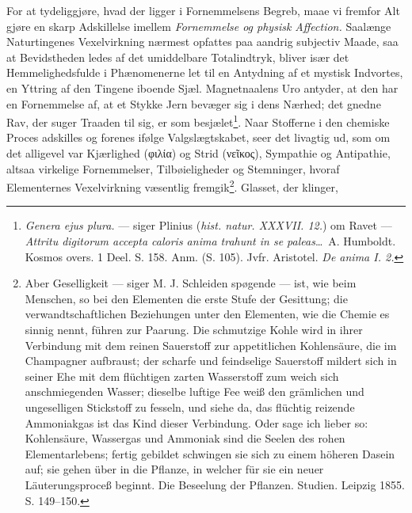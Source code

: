 \documentclass[12pt,a4paper]{book}
\begin{document}
For at tydeliggjøre, hvad der ligger i Fornemmelsens Begreb, maae vi fremfor
Alt gjøre en skarp Adskillelse imellem \emph{Fornemmelse og physisk
Affection.} Saalænge Naturtingenes Vexelvirkning nærmest opfattes paa aandrig
subjectiv Maade, saa at Bevidstheden ledes af det umiddelbare Totalindtryk,
bliver især det Hemmelighedsfulde i Phænomenerne let til en Antydning af et
mystisk Indvortes, en Yttring af den Tingene iboende Sjæl. Magnetnaalens Uro
antyder, at den har en Fornemmelse af, at et Stykke Jern bevæger sig i dens
Nærhed; det gnedne Rav, der suger Traaden til sig, er som
besjælet\footnote{\textit{Genera ejus plura.} --- siger Plinius
(\textit{hist. natur. XXXVII. 12.}) om Ravet --- \textit{Attritu digitorum
accepta caloris anima trahunt in se paleas}\ldots\ A. Humboldt. Kosmos overs.
1 Deel. S. 158. Anm. (S. 105). Jvfr. Aristotel. \textit{De anima I. 2.}}.
Naar Stofferne i den chemiske Proces adskilles og forenes ifølge
Valgslægtskabet, seer det livagtig ud, som om det alligevel var Kjærlighed
(φιλία) og Strid (νεῖκος), Sympathie og Antipathie, altsaa virkelige
Fornemmelser, Tilbøieligheder og Stemninger, hvoraf Elementernes Vexelvirkning
væsentlig fremgik\footnote{Aber Geselligkeit --- siger M. J. Schleiden
spøgende --- ist, wie beim Menschen, so bei den Elementen die erste Stufe der
Gesittung; die verwandtschaftlichen Beziehungen unter den Elementen, wie die
Chemie es sinnig nennt, führen zur Paarung. Die schmutzige Kohle wird in ihrer
Verbindung mit dem reinen Sauerstoff zur appetitlichen Kohlensäure, die im
Champagner aufbraust; der scharfe und feindselige Sauerstoff mildert sich in
seiner Ehe mit dem flüchtigen zarten Wasserstoff zum weich sich anschmiegenden
Wasser; dieselbe luftige Fee weiß den grämlichen und ungeselligen Stickstoff zu
fesseln, und siehe da, das flüchtig reizende Ammoniakgas ist das Kind dieser
Verbindung. Oder sage ich lieber so: Kohlensäure, Wassergas und Ammoniak sind
die Seelen des rohen Elementarlebens; fertig gebildet schwingen
sie sich zu einem höheren Dasein auf; sie gehen über in die Pflanze, in welcher
für sie ein neuer Läuterungsproceß beginnt. Die Beseelung der Pflanzen.
Studien. Leipzig 1855. S. 149--150.}. Glasset, der klinger,
\end{document}
